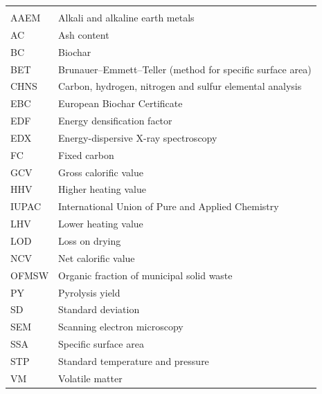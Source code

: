 {\small
\begin{longtable}{L{3cm}L{12cm}}
\toprule
{} & \\
\midrule
\endfirsthead
\toprule
{} & \\
\midrule
\endhead
AAEM   & Alkali and alkaline earth metals\\
AC     & Ash content\\
BC     & Biochar\\
BET    & Brunauer--Emmett--Teller (method for specific surface area)\\
CHNS   & Carbon, hydrogen, nitrogen and sulfur elemental analysis\\
EBC    & European Biochar Certificate\\
EDF    & Energy densification factor\\
EDX    & Energy-dispersive X-ray spectroscopy\\
FC     & Fixed carbon\\
GCV    & Gross calorific value\\
HHV    & Higher heating value\\
IUPAC  & International Union of Pure and Applied Chemistry\\
LHV    & Lower heating value\\
LOD    & Loss on drying\\
NCV    & Net calorific value\\
OFMSW  & Organic fraction of municipal solid waste\\
PY     & Pyrolysis yield\\
SD     & Standard deviation\\
SEM    & Scanning electron microscopy\\
SSA    & Specific surface area\\
STP    & Standard temperature and pressure\\
VM     & Volatile matter\\
\bottomrule
\end{longtable}
}